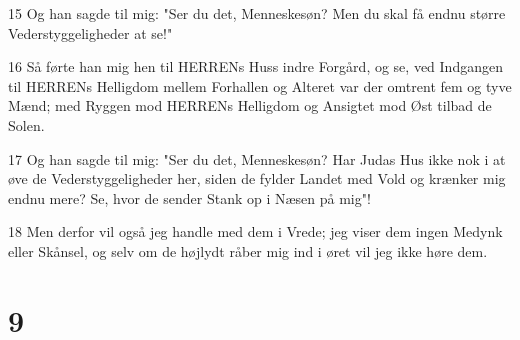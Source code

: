 \par 15 Og han sagde til mig: "Ser du det, Menneskesøn? Men du skal få endnu større Vederstyggeligheder at se!"
\par 16 Så førte han mig hen til HERRENs Huss indre Forgård, og se, ved Indgangen til HERRENs Helligdom mellem Forhallen og Alteret var der omtrent fem og tyve Mænd; med Ryggen mod HERRENs Helligdom og Ansigtet mod Øst tilbad de Solen.
\par 17 Og han sagde til mig: "Ser du det, Menneskesøn? Har Judas Hus ikke nok i at øve de Vederstyggeligheder her, siden de fylder Landet med Vold og krænker mig endnu mere? Se, hvor de sender Stank op i Næsen på mig"!
\par 18 Men derfor vil også jeg handle med dem i Vrede; jeg viser dem ingen Medynk eller Skånsel, og selv om de højlydt råber mig ind i øret vil jeg ikke høre dem.

\chapter{9}

